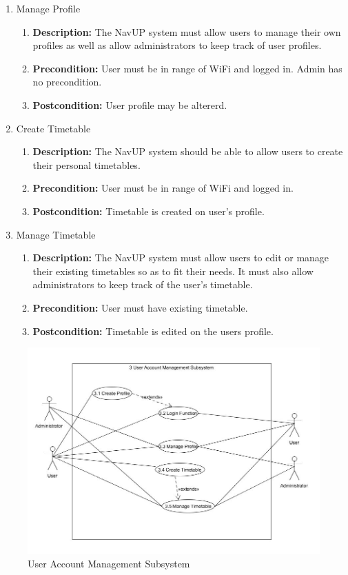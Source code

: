 \documentclass{article}
\begin{document}
\begin{enumerate}
\begin{enumerate}
		\item Manage Profile
		\begin{enumerate}
			\item \textbf{Description:} The NavUP system must allow users to manage their own profiles as well as allow administrators to keep track of user profiles. 
			\item \textbf{Precondition:} User must be in range of WiFi and logged in. Admin has no precondition.  
			\item \textbf{Postcondition:} User profile may be altererd.\newline
		\end{enumerate}
		
		\item Create Timetable
		\begin{enumerate}
			\item \textbf{Description:} The NavUP system should be able to allow users to create their personal timetables. 
			\item \textbf{Precondition:} User must be in range of WiFi and logged in.
			\item \textbf{Postcondition:} Timetable is created on user's profile.\newline
		\end{enumerate}
		
		\item Manage Timetable
		\begin{enumerate}
			\item \textbf{Description:} The NavUP system must allow users to edit or manage their existing timetables so as to fit their needs. It must also allow administrators to keep track of the user’s timetable. 
			\item \textbf{Precondition:} User must have existing timetable.
			\item \textbf{Postcondition:} Timetable is edited on the users profile.\newline
		\end{enumerate}
	\end{enumerate}
	\begin{figure}[h!]
		\includegraphics[scale=0.5]{User_Account_Management.JPG}
		\caption{User Account Management Subsystem}	
	\end{figure}
	

\end{enumerate}
\end{document}
